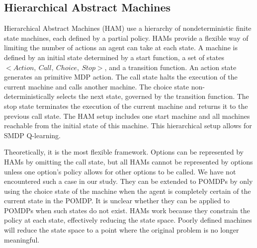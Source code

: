 \subsection{Hierarchical Abstract Machines}

Hierarchical Abstract Machines (HAM) use a hierarchy of nondeterministic finite state machines, each defined by a partial policy.
HAMs provide a flexible way of limiting the number of actions an agent can take at each state.
A machine is defined by an initial state determined by a start function, a set of states $<Action,\ Call,\ Choice,\ Stop>$, and a transition function.
An action state generates
an primitive MDP action. The call state halts the
execution of the current machine and calls another
machine. The choice state non-deterministically selects the next state, governed by the transition function. The
stop state terminates the execution of the current machine and returns it to the previous call state. The HAM setup includes one start machine and all machines reachable from the initial state of this machine. This hierarchical setup allows for SMDP Q-learning. \cite{Parr}

Theoretically, it is the most flexible framework. Options can be represented
by HAMs by omitting the call state, but all HAMs cannot be represented by
options unless one option's policy allows for other options to be called. We
have not encountered such a case in our study. They can be extended to POMDPs
by only using the choice state of the machine when the agent is completely
certain of the current state in the POMDP. It is unclear whether they can be
applied to POMDPs when such states do not exist. HAMs work because they
constrain the policy at each state, effectively reducing the state space.
Poorly defined machines will reduce the state space to a point where the
original problem is no longer meaningful.
